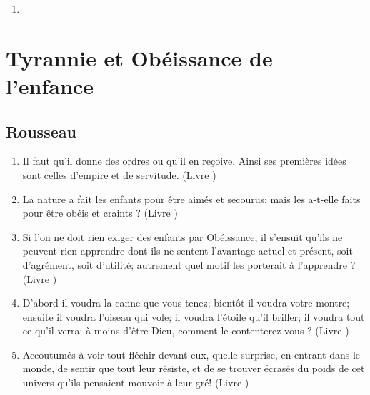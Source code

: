 \documentclass[a4paper, 11pt, hidelinks]{article}
\newcommand{\rb}[1]{\Romanbar{#1}}
\begin{document}
\begin{enumerate}
    \item 
\end{enumerate}














































\section{Tyrannie et Obéissance de l'enfance}



\subsection{Rousseau}


\begin{enumerate}
    \item Il faut qu'il donne des ordres ou qu'il en reçoive. Ainsi ses premières idées sont celles d'empire et de servitude. (Livre \rb{1})
    \item La nature a fait les enfants pour être aimés et secourus; mais les a-t-elle faits pour être obéis et craints ? (Livre \rb{2})
    \item Si l'on ne doit rien exiger des enfants par Obéissance, il s'ensuit qu'ils ne peuvent rien apprendre dont ils ne sentent l'avantage actuel et présent, soit d'agrément, soit d'utilité; autrement quel motif les porterait à l'apprendre ? (Livre \rb{2})
    \item D'abord il voudra la canne que vous tenez; bientôt il voudra votre montre; ensuite il voudra l'oiseau qui vole; il voudra l'étoile qu'il briller; il voudra tout ce qu'il verra: à moins d'être Dieu, comment le contenterez-vous ? (Livre \rb{2})
    \item Accoutumés à voir tout fléchir devant eux, quelle surprise, en entrant dans le monde, de sentir que tout leur résiste, et de se trouver écrasés du poids de cet univers qu'ils pensaient mouvoir à leur gré! (Livre \rb{2})
\end{enumerate}
\end{document}
